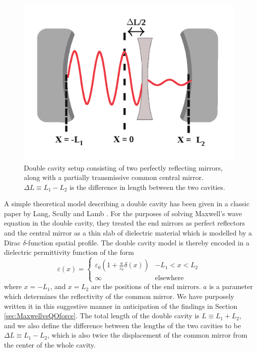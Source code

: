 \documentclass[twocolumn,english,pra,aps,superscriptaddress,floatfix]{revtex4-1}
\begin{document}
\begin{figure}
\includegraphics[width=1\columnwidth]{CavitySetupNew}
\caption{Double cavity setup consisting
of two perfectly reflecting mirrors, along with a partially transmissive common central mirror. $\Delta L \equiv L_{1}-L_{2}$ is the difference in length between the two cavities.}
\label{fig:cavitysetup}
\end{figure}

A simple theoretical model describing a double cavity has been given in a classic paper by 
Lang, Scully and Lamb \cite{lang73}. For the purposes of solving Maxwell's wave equation in the double cavity, they treated the end mirrors as perfect reflectors and the central mirror as a thin slab of dielectric material which is modelled by a Dirac $\delta$-function spatial profile. The double cavity model is thereby encoded in a dielectric permittivity function of the form
 \begin{equation}
\varepsilon(x)=\begin{cases}
\varepsilon_{0}(1+\frac{a}{\varepsilon_{0}} \delta(x)) & -L_{1}<x<L_{2}\\
\infty & \mbox{elsewhere}\end{cases}
\label{perm}
\end{equation}
where $x=-L_{1}$, and $x=L_{2}$ are the positions of the end mirrors. $a$ is a parameter which determines the reflectivity of the common mirror.  We have purposely written it in this suggestive manner in anticipation of the findings in Section \ref{sec:MaxwellvsQOforce}. The total length of the double cavity is $L \equiv L_{1}+L_{2}$, and we also define the difference between the lengths of the two cavities to be $\Delta L \equiv L_{1}-L_{2}$,  which is also twice the displacement of the common mirror from the center of the whole cavity. 
\end{document}
